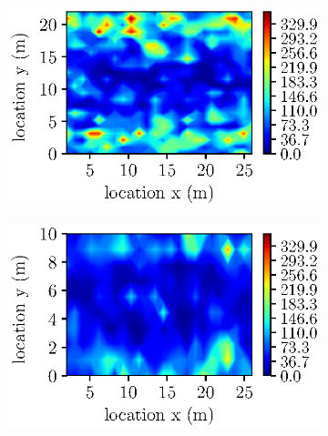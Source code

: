 \begin{figure}[htbp!]
\begin{subfigure}[b]{0.475\columnwidth}
            \label{abswg_width15}
        \end{subfigure}
        \begin{subfigure}[b]{0.475\columnwidth}   
            \centering 
            \caption{}            
            \includegraphics[width=\textwidth]{plots/abswg_width22.eps}
        
            \label{abswg_width22}
           \end{subfigure}      
        \begin{subfigure}[b]{0.475\columnwidth}
            \centering
            \caption{}
            \includegraphics[width=\textwidth]{plots/abswg_width10.eps}
 

\end{subfigure}
\end{figure}
